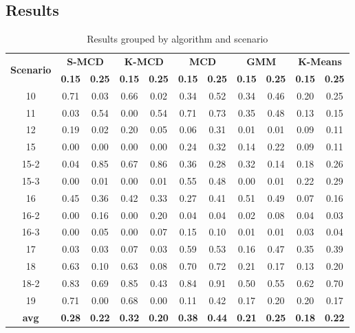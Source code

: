 \documentclass[review]{elsarticle}
\begin{document}
\subsection{Results}
\label{sec:results}

\begin{table}[h!]
  \centering
  \scriptsize
  \caption{Results grouped by algorithm and scenario}
  \label{tab:tab02}
  \begin{tabular}{ c|c c|c c|c c|c c|c c }
	\toprule
	\multirow{2}{*}{\textbf{Scenario}}   &\multicolumn{2}{c}{\textbf{S-MCD}} &\multicolumn{2}{c}{\textbf{K-MCD}} &\multicolumn{2}{c}{\textbf{MCD}} &\multicolumn{2}{c}{\textbf{GMM}} &\multicolumn{2}{c}{\textbf{K-Means}}\\ 
			\hhline{~----------}
			&\textbf{0.15} &\textbf{0.25} &\textbf{0.15} &\textbf{0.25} &\textbf{0.15} &\textbf{0.25} &\textbf{0.15} &\textbf{0.25} &\textbf{0.15} &\textbf{0.25}\\
	\midrule
		10 &\color{red} 0.71 & 0.03 & 0.66 & 0.02 & 0.34 & 0.52 & 0.34 & 0.46 & 0.20 & 0.25 \\ \hline
		11 & 0.03 & 0.54 & 0.00 & 0.54 & 0.71 &\color{red} 0.73 & 0.35 & 0.48 & 0.13 & 0.15 \\ \hline
		12 & 0.19 & 0.02 & 0.20 & 0.05 & 0.06 &\color{red} 0.31 & 0.01 & 0.01 & 0.09 & 0.11 \\ \hline
		15 & 0.00 & 0.00 & 0.00 & 0.00 & 0.24 &\color{red} 0.32 & 0.14 & 0.22 & 0.09 & 0.11 \\ \hline
		15-2 & 0.04 & 0.85 & 0.67 &\color{red} 0.86 & 0.36 & 0.28 & 0.32 & 0.14 & 0.18 & 0.26 \\ \hline
		15-3 & 0.00 & 0.01 & 0.00 & 0.01 &\color{red} 0.55 & 0.48 & 0.00 & 0.01 & 0.22 & 0.29 \\ \hline
		16 & 0.45 & 0.36 & 0.42 & 0.33 & 0.27 & 0.41 &\color{red} 0.51 & 0.49 & 0.07 & 0.16 \\ \hline
		16-2 & 0.00 & 0.16 & 0.00 &\color{red} 0.20 & 0.04 & 0.04 & 0.02 & 0.08 & 0.04 & 0.03 \\ \hline
		16-3 & 0.00 & 0.05 & 0.00 & 0.07 &\color{red} 0.15 & 0.10 & 0.01 & 0.01 & 0.03 & 0.04 \\ \hline
		17 & 0.03 & 0.03 & 0.07 & 0.03 &\color{red} 0.59 & 0.53 & 0.16 & 0.47 & 0.35 & 0.39 \\ \hline
		18 & 0.63 & 0.10 & 0.63 & 0.08 & 0.70 &\color{red} 0.72 & 0.21 & 0.17 & 0.13 & 0.20 \\ \hline
		18-2 & 0.83 & 0.69 & 0.85 & 0.43 & 0.84 &\color{red} 0.91 & 0.50 & 0.55 & 0.62 & 0.70 \\ \hline
		19 &\color{red} 0.71 & 0.00 & 0.68 & 0.00 & 0.11 & 0.42 & 0.17 & 0.20 & 0.20 & 0.17 \\ \hline
		\rowcolor{Gray} \textbf{avg} & \textbf{0.28} & \textbf{0.22} & \textbf{0.32} & \textbf{0.20} & \textbf{0.38} &\color{red} \textbf{0.44} & \textbf{0.21} & \textbf{0.25} & \textbf{0.18} & \textbf{0.22} \\ 
    \bottomrule
  \end{tabular}
\end{table}
\end{document}
